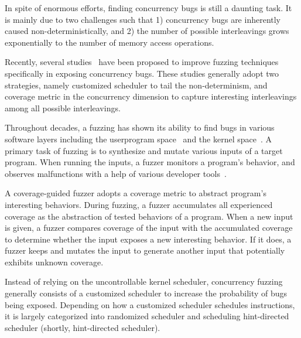

In spite of enormous efforts, finding concurrency bugs is still a
daunting task.
%
It is mainly due to two challenges such that 1) concurrency bugs are
inherently caused non-deterministically, and 2) the number of possible
interleavings grows exponentially to the number of memory access
operations.

Recently, several studies~\cite{razzer, krace, snowboard, muzz} have
been proposed to improve fuzzing techniques specifically in exposing
concurrency bugs.
%
These studies generally adopt two strategies, namely customized
scheduler to tail the non-determinism, and coverage metric in the
concurrency dimension to capture interesting interleavings among all
possible interleavings.

%
Throughout decades, a fuzzing has shown its ability to find bugs in
various software layers including the userprogram space~\cite{qsym,
  driller, symsan, crfuzz, r2z2, cafl, fuzzorigin} and the kernel
space~\cite{fuzzusb, syzkaller, hfl, cabfuzz, razzer, krace, janus,
  hydra, healer}.
%
A primary task of fuzzing is to synthesize and mutate various inputs
of a target program.
%
When running the inputs, a fuzzer monitors a program's behavior, and
observes malfunctions with a help of various developer
tools~\cite{asan, kasan, meds}.

A coverage-guided fuzzer adopts a coverage metric to abstract
program's interesting behaviors.
%
During fuzzing, a fuzzer accumulates all experienced coverage as the
abstraction of tested behaviors of a program.
%
When a new input is given, a fuzzer compares coverage of the input
with the accumulated coverage to determine whether the input exposes a
new interesting behavior. If it does, a fuzzer keeps and mutates the
input to generate another input that potentially exhibits unknown
coverage.


%
Instead of relying on the uncontrollable kernel scheduler, concurrency
fuzzing generally consists of a customized scheduler to increase the
probability of bugs being exposed.
%
Depending on how a customized scheduler schedules instructions, it is
largely categorized into randomized scheduler and scheduling
hint-directed scheduler (shortly, hint-directed scheduler).

